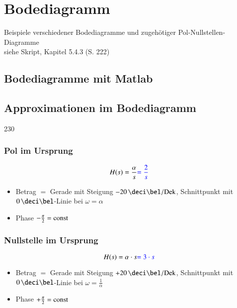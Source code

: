 \section{Bodediagramm}

Beispiele verschiedener Bodediagramme und zugehötiger Pol-Nullstellen-Diagramme \\
siehe Skript, Kapitel 5.4.3 (S. 222)


\subsection{Bodediagramme mit Matlab}




\subsection{Approximationen im Bodediagramm}{230}

\subsubsection{Pol im Ursprung}

\begin{minipage}[t]{0.48\columnwidth}
    $$ H(s) = \frac{\alpha}{s} {\color{blue}= \frac{2}{s}} $$
    
\end{minipage}
\hfill
\begin{minipage}[t]{0.48\columnwidth}
    \begin{itemize}
        \item Betrag $=$ Gerade mit Steigung $- 20 \, \deci \bel / \Dek$, Schnittpunkt mit $0 \, \deci\bel$-Linie bei $\omega = \alpha$
        \item Phase $- \frac{\pi}{2} = \mathrm{const}$
    \end{itemize}
\end{minipage}


\subsubsection{Nullstelle im Ursprung}

\begin{minipage}[t]{0.48\columnwidth}
    $$ H(s) = \alpha \cdot s {\color{blue}= 3\cdot s} $$
    
\end{minipage}
\hfill
\begin{minipage}[t]{0.48\columnwidth}
    \begin{itemize}
        \item Betrag $=$ Gerade mit Steigung $+ 20 \, \deci \bel / \Dek$, Schnittpunkt mit $0 \, \deci\bel$-Linie bei $\omega = \frac{1}{\alpha}$
        \item Phase $+ \frac{\pi}{2} = \mathrm{const}$
    \end{itemize}
\end{minipage}


